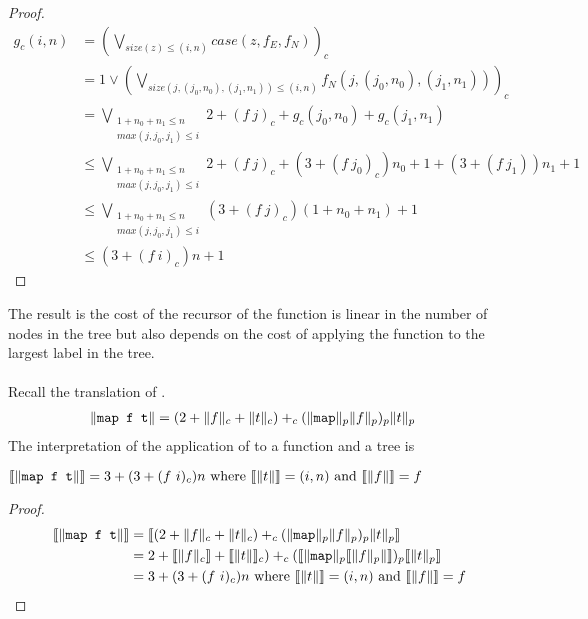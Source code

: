 \begin{proof}
\begin{align*}
  g_c(i,n) &= (\bigvee\limits_{size(z) \leq (i,n)} case(z,f_E,f_N))_c \\
           &= 1 \vee (\bigvee\limits_{size(j,(j_0,n_0),(j_1,n_1)) \leq (i,n)} f_N(j,(j_0,n_0),(j_1,n_1)))_c \\
           &= \bigvee\limits_{\substack{1 + n_0 + n_1 \leq n\\max(j,j_0,j_1)\leq i}} 2 + (f\ j)_c + g_c(j_0,n_0) + g_c(j_1,n_1) \\
           &\leq \bigvee\limits_{\substack{1 + n_0 + n_1 \leq n\\max(j,j_0,j_1)\leq i}} 2 + (f\ j)_c + (3 + (f\ j_0)_c)n_0 + 1 + (3 + (f\ j_1))n_1 + 1\\
           &\leq \bigvee\limits_{\substack{1 + n_0 + n_1 \leq n\\max(j,j_0,j_1)\leq i}} (3 + (f\ j)_c)(1 + n_0 + n_1) + 1\\
           &\leq (3 + (f\ i)_c)n + 1
\end{align*}
\end{proof}
%
The result is the cost of the recursor of the  function is linear in the
number of nodes in the tree but also depends on the cost of applying the
function to the largest label in the tree.

\paragraph{}
Recall the translation of .
%
\begin{align*}
  \|\texttt{map f t}\| &= (2 + \|f\|_c + \|t\|_c) +_c (\|\texttt{map}\|_p \|f\|_p)_p \|t\|_p
\end{align*}
%
The interpretation of the application of  to a function  and a tree  is
%
\begin{lemma}
  \label{lem:treemap_cost}
  $\llbracket\|\texttt{map f t}\|\rrbracket = 3 + (3 + (f\ i)_c)n \text{ where } \llbracket\|t\|\rrbracket = (i,n) \text{ and } \llbracket\|f\|\rrbracket = f$
\end{lemma}
\begin{proof}
\begin{align*}
  \llbracket\|\texttt{map f t}\|\rrbracket &= \llbracket(2 + \|f\|_c + \|t\|_c) +_c (\|\texttt{map}\|_p \|f\|_p)_p \|t\|_p\rrbracket \\
                        &= 2 + \llbracket\|f\|_c\rrbracket + \llbracket\|t\|\rrbracket_c) +_c (\llbracket\|\texttt{map}\|_p \llbracket\|f\|_p\|\rrbracket)_p \llbracket\|t\|_p\rrbracket \\
                        &= 3 + (3 + (f\ i)_c)n \text{ where } \llbracket\|t\|\rrbracket = (i,n) \text{ and } \llbracket\|f\|\rrbracket = f
\end{align*}
\end{proof}
%
